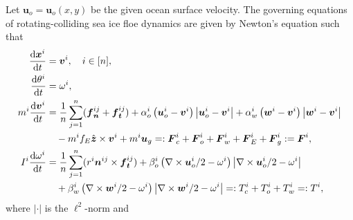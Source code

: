 \documentclass[a4paper,11pt]{article}
\numberwithin{equation}{section}
\theoremstyle{definition}
\newcommand{\bfs}[1]{{\boldsymbol #1}}
\newcommand{\bfx}{\boldsymbol{x}}
\newcommand{\bfv}{\boldsymbol{v}}
\newcommand{\bfn}{\boldsymbol{n}}
\newcommand{\bft}{\boldsymbol{t}}
\newcommand{\bfu}{\boldsymbol{u}_o}
\newcommand{\bfuu}{\boldsymbol{u}}
\newcommand{\bff}{\boldsymbol{f}}
\newcommand{\bfF}{\boldsymbol{F}}
\newcommand{\bfw}{\boldsymbol{w}}
\def\d{{  \rm d}}
\begin{document}
Let $\bfu = \bfu(x,y)$ be the given ocean surface velocity.
%
The governing equations of rotating-colliding sea ice floe dynamics are given by Newton's equation such that \cite{damsgaard2018application,deng2024particle}
\begin{subequations}\label{eq:dem}
\begin{align}
  \frac{\d\bfx^i}{\d t} &= \bfv^i, \quad i \in [n], \label{dem_x}\\
  \frac{\d\theta^i}{\d t}  &= \omega^i,\label{dem_t}\\
  m^i\frac{\d\bfv^i}{\d t} &=   \frac{1}{n} \sum_{j=1}^{n}(\bff_{\bfn}^{ij} + \bff_{\bft}^{ij}) + \alpha^i_o\left(\bfu^i -\bfv^i\right)\left| \bfu^i -\bfv^i\right| + \alpha^i_w\left(\bfw^i -\bfv^i\right)\left| \bfw^i -\bfv^i\right| \nonumber \\
  & \quad - m^i f_E \hat{\bfs{z}}\times \bfv^i  + m^i \bfuu_g 
  =: \bfF^i_c + \bfF^i_o + \bfF^i_w + \bfF^i_E + \bfF^i_g := \bfF^i,\label{dem_v}\\
  I^i\frac{\d\omega^i}{\d t} &= \frac{1}{n} \sum_{j=1}^{n} ( r^i\bfn^{ij}\times \bff_{\bft}^{ij})  + \beta^i_o \left(\nabla\times \bfu^i/2-\omega^i \right)\left|\nabla\times \bfu^i/2-\omega^i \right| \nonumber \\
  & \quad +  \beta^i_w \left(\nabla\times \bfw^i/2-\omega^i \right)\left|\nabla\times \bfw^i/2-\omega^i \right|
  =: T^i_c + T^i_o +T^i_w =: T^i,\label{dem_w}
\end{align}  
\end{subequations}
where $|\cdot|$ is the $\ell^2$-norm and
\end{document}
